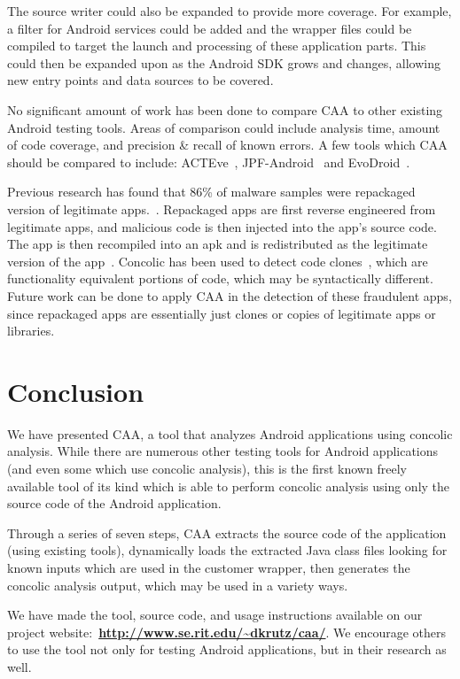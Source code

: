 \documentclass{sig-alternate-05-2015}
\begin{document}
The source writer could also be expanded to provide more coverage. For example, a filter for Android services could be added and the wrapper files could be compiled to target the launch and processing of these application parts. This could then be expanded upon as the Android SDK grows and changes, allowing new entry points and data sources to be covered.

No significant amount of work has been done to compare CAA to other existing Android testing tools. Areas of comparison could include analysis time, amount of code coverage, and precision \& recall of known errors. A few  tools which CAA should be compared to include: ACTEve~\cite{Anand:2012:ACT:2393596.2393666}, JPF-Android~\cite{vanderMerwe:2014:EPS:2557833.2560576} and EvoDroid~\cite{Mahmood:2014:ESE:2635868.2635896}.


Previous research has found that 86\% of malware samples were repackaged version of legitimate apps.~\cite{Zhou:2012:DAM:2310656.2310710}. Repackaged apps are first reverse engineered from legitimate apps, and malicious code is then injected into the app's source code. The app is then recompiled into an apk and is redistributed as the legitimate version of the app~\cite{Soh:2015:DCA:2820282.2820305}. Concolic has been used to detect code clones~\cite{Krutz_Sac15, 6671332}, which are functionality equivalent portions of code, which may be syntactically different. Future work can be done to apply CAA in the detection of these fraudulent apps, since repackaged apps are essentially just clones or copies of legitimate apps or libraries.




\section{Conclusion}
\label{sec: conclusion}

We have presented CAA, a tool that analyzes Android applications using concolic analysis. While there are numerous other testing tools for Android applications (and even some which use concolic analysis), this is the first known freely available tool of its kind which is able to perform concolic analysis using only the source code of the Android application.

Through a series of seven steps, CAA extracts the source code of the application (using existing tools), dynamically loads the extracted Java class files looking for known inputs which are used in the customer wrapper, then generates the concolic analysis output, which may be used in a variety ways.

We have made the tool, source code, and usage instructions available on our project website:~\textbf{\url{http://www.se.rit.edu/~dkrutz/caa/}}. We encourage others to use the tool not only for testing Android applications, but in their research as well.


\balance



\end{document}
